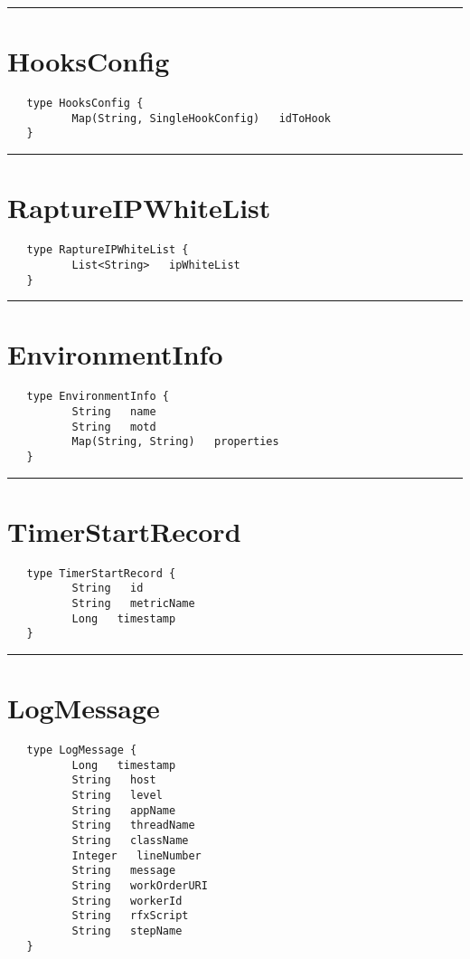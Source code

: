\rule{12cm}{2pt}
\section{HooksConfig}
\label{type:HooksConfig}

\begin{verbatim}
   type HooksConfig {
          Map(String, SingleHookConfig)   idToHook
   }
\end{verbatim}

\rule{12cm}{2pt}
\section{RaptureIPWhiteList}
\label{type:RaptureIPWhiteList}

\begin{verbatim}
   type RaptureIPWhiteList {
          List<String>   ipWhiteList
   }
\end{verbatim}

\rule{12cm}{2pt}
\section{EnvironmentInfo}
\label{type:EnvironmentInfo}

\begin{verbatim}
   type EnvironmentInfo {
          String   name
          String   motd
          Map(String, String)   properties
   }
\end{verbatim}

\rule{12cm}{2pt}
\section{TimerStartRecord}
\label{type:TimerStartRecord}

\begin{verbatim}
   type TimerStartRecord {
          String   id
          String   metricName
          Long   timestamp
   }
\end{verbatim}

\rule{12cm}{2pt}
\section{LogMessage}
\label{type:LogMessage}

\begin{verbatim}
   type LogMessage {
          Long   timestamp
          String   host
          String   level
          String   appName
          String   threadName
          String   className
          Integer   lineNumber
          String   message
          String   workOrderURI
          String   workerId
          String   rfxScript
          String   stepName
   }
\end{verbatim}

